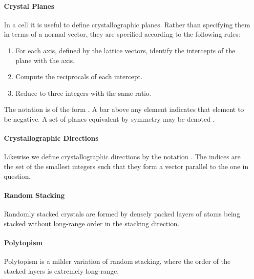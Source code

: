 

\paragraph{Crystal Planes}
In a cell it is useful to define crystallographic planes. Rather than specifying them in terms of a normal vector, they are specified according to the following rules:
\begin{enumerate}
	\item For each axis, defined by the lattice vectors, identify the intercepts of the plane with the axis.
	\item Compute the reciprocals of each intercept.
	\item Reduce to three integers with the same ratio.
\end{enumerate}
The notation is of the form . A bar above any element indicates that element to be negative. A set of planes equivalent by symmetry may be denoted .

\paragraph{Crystallographic Directions}
Likewise we define crystallographic directions by the notation . The indices are the set of the smallest integers such that they form a vector parallel to the one in question.

\paragraph{Random Stacking}
Randomly stacked crystals are formed by densely packed layers of atoms being stacked without long-range order in the stacking direction.

\paragraph{Polytopism}
Polytopism is a milder variation of random stacking, where the order of the stacked layers is extremely long-range.
